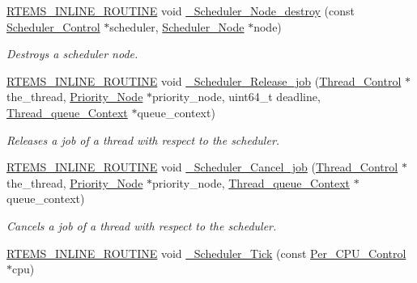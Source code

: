 \begin{DoxyCompactItemize}
\mbox{\hyperlink{group__RTEMSScoreBaseDefs_gac216239df231d5dbd15e3520b0b9313f}{R\+T\+E\+M\+S\+\_\+\+I\+N\+L\+I\+N\+E\+\_\+\+R\+O\+U\+T\+I\+NE}} void \mbox{\hyperlink{group__RTEMSScoreScheduler_ga51626159a058109c378e2142c0e2d548}{\+\_\+\+Scheduler\+\_\+\+Node\+\_\+destroy}} (const \mbox{\hyperlink{struct__Scheduler__Control}{Scheduler\+\_\+\+Control}} $\ast$scheduler, \mbox{\hyperlink{structScheduler__Node}{Scheduler\+\_\+\+Node}} $\ast$node)
\begin{DoxyCompactList}\small\item\em Destroys a scheduler node. \end{DoxyCompactList}\item 
\mbox{\hyperlink{group__RTEMSScoreBaseDefs_gac216239df231d5dbd15e3520b0b9313f}{R\+T\+E\+M\+S\+\_\+\+I\+N\+L\+I\+N\+E\+\_\+\+R\+O\+U\+T\+I\+NE}} void \mbox{\hyperlink{group__RTEMSScoreScheduler_gaf53f73c8af714527362915d8deee178b}{\+\_\+\+Scheduler\+\_\+\+Release\+\_\+job}} (\mbox{\hyperlink{struct__Thread__Control}{Thread\+\_\+\+Control}} $\ast$the\+\_\+thread, \mbox{\hyperlink{structPriority__Node}{Priority\+\_\+\+Node}} $\ast$priority\+\_\+node, uint64\+\_\+t deadline, \mbox{\hyperlink{structThread__queue__Context}{Thread\+\_\+queue\+\_\+\+Context}} $\ast$queue\+\_\+context)
\begin{DoxyCompactList}\small\item\em Releases a job of a thread with respect to the scheduler. \end{DoxyCompactList}\item 
\mbox{\hyperlink{group__RTEMSScoreBaseDefs_gac216239df231d5dbd15e3520b0b9313f}{R\+T\+E\+M\+S\+\_\+\+I\+N\+L\+I\+N\+E\+\_\+\+R\+O\+U\+T\+I\+NE}} void \mbox{\hyperlink{group__RTEMSScoreScheduler_gaa4fcdf5fd641701ca171698b0ce20032}{\+\_\+\+Scheduler\+\_\+\+Cancel\+\_\+job}} (\mbox{\hyperlink{struct__Thread__Control}{Thread\+\_\+\+Control}} $\ast$the\+\_\+thread, \mbox{\hyperlink{structPriority__Node}{Priority\+\_\+\+Node}} $\ast$priority\+\_\+node, \mbox{\hyperlink{structThread__queue__Context}{Thread\+\_\+queue\+\_\+\+Context}} $\ast$queue\+\_\+context)
\begin{DoxyCompactList}\small\item\em Cancels a job of a thread with respect to the scheduler. \end{DoxyCompactList}\item 
\mbox{\hyperlink{group__RTEMSScoreBaseDefs_gac216239df231d5dbd15e3520b0b9313f}{R\+T\+E\+M\+S\+\_\+\+I\+N\+L\+I\+N\+E\+\_\+\+R\+O\+U\+T\+I\+NE}} void \mbox{\hyperlink{group__RTEMSScoreScheduler_ga42c763a880e031610302ce44807c293b}{\+\_\+\+Scheduler\+\_\+\+Tick}} (const \mbox{\hyperlink{structPer__CPU__Control}{Per\+\_\+\+C\+P\+U\+\_\+\+Control}} $\ast$cpu)

\end{DoxyCompactItemize}
